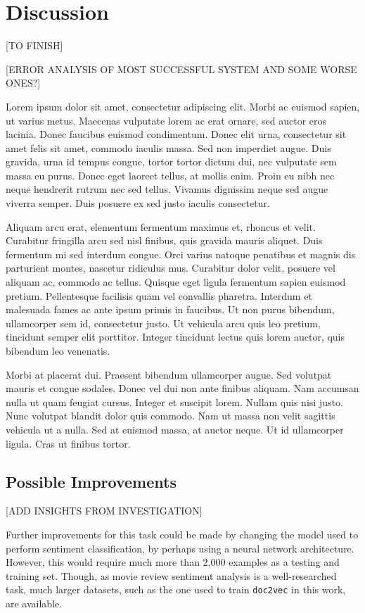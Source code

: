 \documentclass[twocolumn]{article}
\begin{document}
\section{Discussion}

[TO FINISH]

[ERROR ANALYSIS OF MOST SUCCESSFUL SYSTEM AND SOME WORSE ONES?]

Lorem ipsum dolor sit amet, consectetur adipiscing elit. Morbi ac euismod sapien, ut varius metus. Maecenas vulputate lorem ac erat ornare, sed auctor eros lacinia. Donec faucibus euismod condimentum. Donec elit urna, consectetur sit amet felis sit amet, commodo iaculis massa. Sed non imperdiet augue. Duis gravida, urna id tempus congue, tortor tortor dictum dui, nec vulputate sem massa eu purus. Donec eget laoreet tellus, at mollis enim. Proin eu nibh nec neque hendrerit rutrum nec sed tellus. Vivamus dignissim neque sed augue viverra semper. Duis posuere ex sed justo iaculis consectetur.

Aliquam arcu erat, elementum fermentum maximus et, rhoncus et velit. Curabitur fringilla arcu sed nisl finibus, quis gravida mauris aliquet. Duis fermentum mi sed interdum congue. Orci varius natoque penatibus et magnis dis parturient montes, nascetur ridiculus mus. Curabitur dolor velit, posuere vel aliquam ac, commodo ac tellus. Quisque eget ligula fermentum sapien euismod pretium. Pellentesque facilisis quam vel convallis pharetra. Interdum et malesuada fames ac ante ipsum primis in faucibus. Ut non purus bibendum, ullamcorper sem id, consectetur justo. Ut vehicula arcu quis leo pretium, tincidunt semper elit porttitor. Integer tincidunt lectus quis lorem auctor, quis bibendum leo venenatis.

Morbi at placerat dui. Praesent bibendum ullamcorper augue. Sed volutpat mauris et congue sodales. Donec vel dui non ante finibus aliquam. Nam accumsan nulla ut quam feugiat cursus. Integer et suscipit lorem. Nullam quis nisi justo. Nunc volutpat blandit dolor quis commodo. Nam ut massa non velit sagittis vehicula ut a nulla. Sed at euismod massa, at auctor neque. Ut id ullamcorper ligula. Cras ut finibus tortor.

\subsection{Possible Improvements}

[ADD INSIGHTS FROM INVESTIGATION]

Further improvements for this task could be made by changing the model used to perform sentiment classification, by perhaps using a neural network architecture. However, this would require much more than 2,000 examples as a testing and training set. Though, as movie review sentiment analysis is a well-researched task, much larger datasets, such as the one used to train \texttt{doc2vec} in this work, are available.
\end{document}
